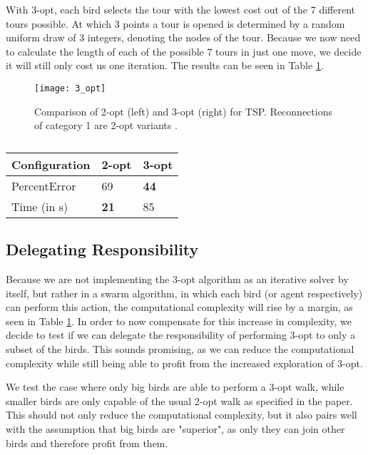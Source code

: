 With 3-opt, each bird selects the tour with the lowest cost out of the 7 different tours possible.
At which 3 points a tour is opened is determined by a random uniform draw of 3 integers,
denoting the nodes of the tour. Because we now need to calculate the length of each of the possible 7 tours
in just one move, we decide it will still only cost us one iteration.
The results can be seen in Table \ref{3_opt_performance}.

\begin{figure}[htbp]
\centerline{\texttt{[image: 3\_opt]}}
\caption{Comparison of 2-opt (left) and 3-opt (right) for TSP. Reconnections of category 1 are 2-opt variants \cite{3_opt}.}
\label{3_opt}
\end{figure}

\begin{table}[h!]
\centering
\begin{tabular}{ |p{2cm}||p{0.75cm}|p{0.75cm}|  }
 \hline
 Configuration& 2-opt & \textbf{3-opt}\\
 \hline \hline
PercentError & 69 & \textbf{44}\\
 \hline
 Time (in s) & \textbf{21} & 85\\
 \hline
\end{tabular}
\caption{}
\label{3_opt_performance}
\end{table}

\subsection{Delegating Responsibility}

Because we are not implementing the 3-opt algorithm as an iterative solver by itself,
but rather in a swarm algorithm, in which each bird (or agent respectively) can perform this action,
the computational complexity will rise by a margin, as seen in Table \ref{3_opt_performance}.
In order to now compensate for this increase in complexity, we decide to test if we can delegate
the responsibility of performing 3-opt to only a subset of the birds. This sounds promising, as
we can reduce the computational complexity while still being able to profit from the increased exploration of 3-opt.

We test the case where only big birds are able to perform a 3-opt walk, while smaller birds
are only capable of the usual 2-opt walk as specified in the paper. 
This should not only reduce the computational complexity, but it also pairs well with the 
assumption that big birds are "superior", as only they can join other birds and therefore profit from them.

